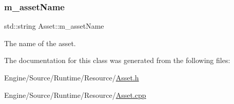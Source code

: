 \subsubsection{\texorpdfstring{m\+\_\+asset\+Name}{m\_assetName}}
{\footnotesize\ttfamily std\+::string Asset\+::m\+\_\+asset\+Name\hspace{0.3cm}{\ttfamily [protected]}}

The name of the asset. 

The documentation for this class was generated from the following files\+:\begin{DoxyCompactItemize}
\item 
Engine/\+Source/\+Runtime/\+Resource/\mbox{\hyperlink{_asset_8h}{Asset.\+h}}\item 
Engine/\+Source/\+Runtime/\+Resource/\mbox{\hyperlink{_asset_8cpp}{Asset.\+cpp}}\end{DoxyCompactItemize}
